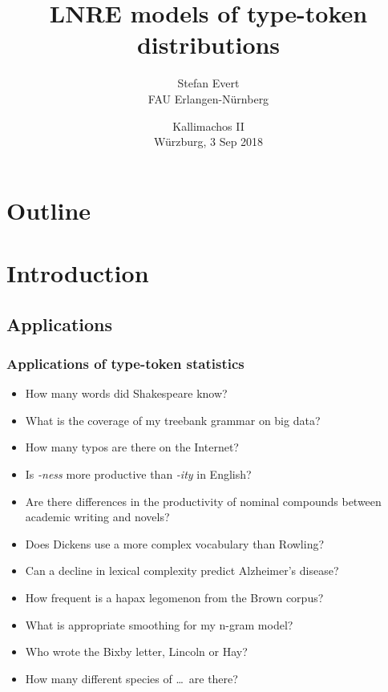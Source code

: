 \documentclass[t]{beamer} %
\title[LNRE models]{LNRE models of type-token distributions}
\subtitle{}
\author[Stefan Evert]{Stefan Evert\\ FAU Erlangen-Nürnberg}
\date[Würzburg | 3 Sep 2018]{\small Kallimachos II\\Würzburg, 3 Sep 2018}
\begin{document}

\frame{\titlepage}
\hideLogo{}


\section*{Outline}

\section{Introduction}

\subsection{Applications}

\begin{frame}
  \frametitle{Applications of type-token statistics}

  \begin{itemize}
  \item How many words did Shakespeare know?
  \item What is the coverage of my treebank grammar on big data?
  \item How many typos are there on the Internet?
  \item Is \emph{-ness} more productive than \emph{-ity} in English?
  \item Are there differences in the productivity of nominal compounds between academic writing and novels?
  \item Does Dickens use a more complex vocabulary than Rowling?
  \item Can a decline in lexical complexity predict Alzheimer's disease?
  \item How frequent is a hapax legomenon from the Brown corpus?
  \item What is appropriate smoothing for my n-gram model?
  \item Who wrote the Bixby letter, Lincoln or Hay?
  \item How many different species of \ldots\ are there? \citep{Brainerd:82}
  \end{itemize}
\end{frame}
\end{document}
